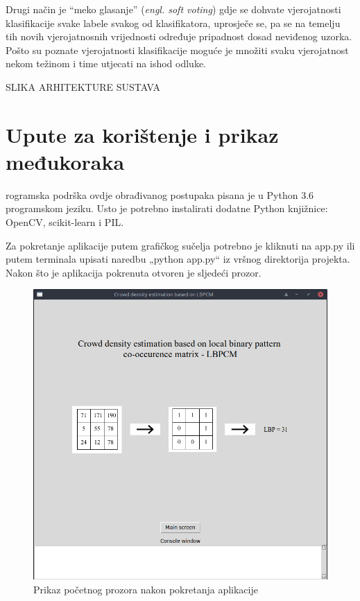 \documentclass[times, utf8, zavrsni]{fer}
\begin{document}
\bigbreak

Drugi način je \enquote{meko glasanje} (\textit{engl. soft voting}) gdje
se dohvate vjerojatnosti klasifikacije svake labele svakog od klasifikatora,
uprosječe se, pa se na temelju tih novih vjerojatnosnih vrijednosti određuje
pripadnost dosad neviđenog uzorka. Pošto su poznate vjerojatnosti klasifikacije
moguće je množiti svaku vjerojatnost nekom težinom i time utjecati na ishod odluke.


\begin{center}

SLIKA ARHITEKTURE SUSTAVA

\end{center}

\chapter{Upute za korištenje i prikaz međukoraka}

rogramska podrška ovdje obrađivanog postupaka pisana je u Python 3.6 
programskom jeziku. Usto je potrebno instalirati dodatne Python 
knjižnice: OpenCV, scikit-learn i PIL.

Za pokretanje aplikacije putem grafičkog sučelja potrebno je kliknuti 
na app.py ili putem terminala upisati naredbu „python app.py“ iz 
vršnog direktorija projekta. Nakon što je aplikacija pokrenuta 
otvoren je sljedeći prozor. 

\begin{figure}[ht]
\centering
\includegraphics[scale=0.4]{img/startpage.png}
\caption{Prikaz početnog prozora nakon pokretanja aplikacije}
\end{figure}
\end{document}
